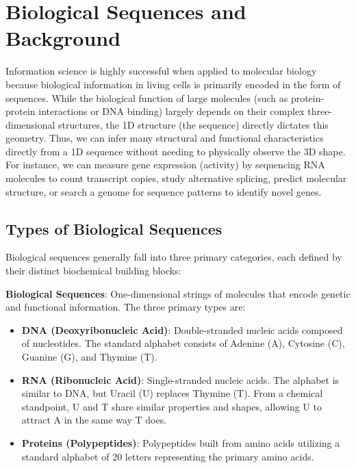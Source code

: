 
\section{Biological Sequences and Background}

Information science is highly successful when applied to molecular biology because biological information in living cells is primarily encoded in the form of sequences. While the biological function of large molecules (such as protein-protein interactions or DNA binding) largely depends on their complex three-dimensional structures, the 1D structure (the sequence) directly dictates this geometry. Thus, we can infer many structural and functional characteristics directly from a 1D sequence without needing to physically observe the 3D shape. For instance, we can measure gene expression (activity) by sequencing RNA molecules to count transcript copies, study alternative splicing, predict molecular structure, or search a genome for sequence patterns to identify novel genes.

\subsection{Types of Biological Sequences}

Biological sequences generally fall into three primary categories, each defined by their distinct biochemical building blocks:

\begin{important}
    \textbf{Biological Sequences}: One-dimensional strings of molecules that encode genetic and functional information. The three primary types are:
    \begin{itemize}
        \item \textbf{DNA (Deoxyribonucleic Acid)}: Double-stranded nucleic acids composed of nucleotides. The standard alphabet consists of Adenine (A), Cytosine (C), Guanine (G), and Thymine (T).
        \item \textbf{RNA (Ribonucleic Acid)}: Single-stranded nucleic acids. The alphabet is similar to DNA, but Uracil (U) replaces Thymine (T). From a chemical standpoint, U and T share similar properties and shapes, allowing U to attract A in the same way T does.
        \item \textbf{Proteins (Polypeptides)}: Polypeptides built from amino acids utilizing a standard alphabet of 20 letters representing the primary amino acids.
    \end{itemize}
\end{important}

